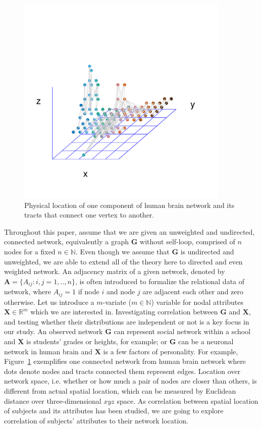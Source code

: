 \documentclass[12pt]{article}
\theoremstyle{definition}
\begin{document}
\begin{figure}[h]
	\centering
	\includegraphics[width=4in]{../Figure/intro.pdf}	
	\caption{Physical location of one component of human brain network and its tracts that connect one vertex to another.}
	\label{fig:intro}
\end{figure}

Throughout this paper, assume that we are given an unweighted and undirected, connected network, equivalently a graph $\mathbf{G}$ without self-loop, comprised of $n$ nodes for a fixed $n \in \mathbb{N}$. Even though we assume that $\mathbf{G}$ is undirected and unweighted, we are able to extend all of the theory here to directed and even weighted network. An adjacency matrix of a given network, denoted by $\mathbf{A} = \{A_{ij} : i,j= 1,..,n \}$, is often introduced to formalize the relational data of network, where $A_{ij} = 1$ if node $i$ and node $j$ are adjacent each other and zero otherwise. Let us introduce a $m$-variate ($m \in \mathbb{N}$) variable for nodal attributes $\mathbf{X}  \in \mathbb{R}^{m}$ which we are interested in. Investigating correlation between $\mathbf{G}$ and $\mathbf{X}$, and testing whether their distributions are independent or not is a key focus in our study. An observed network $\mathbf{G}$ can represent social network within a school and $\mathbf{X}$ is students' grades or heights, for example; or $\mathbf{G}$ can be a neuronal network in human brain and $\mathbf{X}$ is a few factors of personality. For example, Figure~\ref{fig:intro} exemplifies one connected network from human brain network where dots denote nodes and tracts connected them represent edges. Location over network space, i.e. whether or how much a pair of nodes are closer than others, is different from actual spatial location, which can be measured by Euclidean distance over three-dimensional $xyz$ space. As correlation between spatial location of subjects and its attributes has been studied, we are going to explore correlation of subjects' attributes to their network location. 
	
\end{document}
